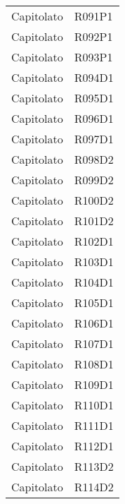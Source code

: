 \documentclass[../analisi-dei-requisiti.tex]{subfiles}
\begin{document}
\begin{longtable}[H]{ p{3cm} | p{4cm} }
  Capitolato                    & R091P1                               \\
  Capitolato                    & R092P1                               \\
  Capitolato                    & R093P1                               \\
  Capitolato                    & R094D1                               \\
  Capitolato                    & R095D1                               \\
  Capitolato                    & R096D1                               \\
  Capitolato                    & R097D1                               \\
  Capitolato                    & R098D2                               \\
  Capitolato                    & R099D2                               \\
  Capitolato                    & R100D2                               \\
  Capitolato                    & R101D2                               \\
  Capitolato                    & R102D1                               \\
  Capitolato                    & R103D1                               \\
  Capitolato                    & R104D1                               \\
  Capitolato                    & R105D1                               \\
  Capitolato                    & R106D1                               \\
  Capitolato                    & R107D1                               \\
  Capitolato                    & R108D1                               \\
  Capitolato                    & R109D1                               \\
  Capitolato                    & R110D1                               \\
  Capitolato                    & R111D1                               \\
  Capitolato                    & R112D1                               \\
  Capitolato                    & R113D2                               \\
  Capitolato                    & R114D2                               \\
\end{longtable}
\end{document}
